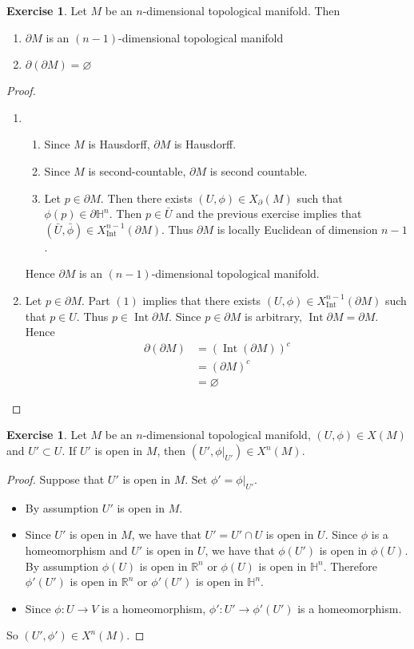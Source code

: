 \documentclass{book}
\theoremstyle{definition}
\newtheorem{ex}[definition]{Exercise}
\renewcommand{\H}{\mathbb{H}}
\newcommand{\R}{\mathbb{R}}
\DeclareMathOperator{\Int}{Int}
\DeclareMathOperator*{\0}{\mbf{0}}
\DeclareMathOperator*{\1}{\mbf{1}}
\newcommand{\p}{\partial}
\begin{document}
	\begin{ex}
		Let $M$ be an $n$-dimensional topological manifold. Then 
		\begin{enumerate}
			\item $\p M$ is an $(n-1)$-dimensional topological manifold
			\item $\p (\p M) = \varnothing$
		\end{enumerate}
	\end{ex}

	\begin{proof}\
		\begin{enumerate}
			\item 
			\begin{enumerate}
				\item Since $M$ is Hausdorff, $\p M$ is Hausdorff.
				\item Since $M$ is second-countable, $\p M$ is second countable. 
				\item Let $p \in \p M$. Then there exists $(U, \phi) \in X_{\p}(M)$ such that $\phi(p) \in \p \H^n$. Then $p \in \bar{U}$ and the previous exercise implies that $(\bar{U}, \bar{\phi}) \in X^{n-1}_{\Int}(\p M)$. Thus $\p M$ is locally Euclidean of dimension $n-1$.
			\end{enumerate}
			Hence $\p M$ is an $(n-1)$-dimensional topological manifold.
			\item Let $p \in \p M$. Part $(1)$ implies that there exists $(U, \phi) \in X^{n-1}_{\Int}(\p M)$ such that $p \in U$. Thus $p \in \Int \p M$. Since $p \in \p M$ is arbitrary, $\Int \p M = \p M$. Hence 
			\begin{align*}
				\p (\p M)
				& = (\Int(\p M))^c \\
				& = (\p M)^c \\
				& = \varnothing
			\end{align*} 
		\end{enumerate}
	\end{proof}

	\begin{ex}
		Let $M$ be an $n$-dimensional topological manifold, $(U, \phi) \in X(M)$ and $U' \subset U$. If $U'$ is open in $M$, then $(U', \phi|_{U'}) \in X^n(M)$. 
	\end{ex}
	
	\begin{proof}
		Suppose that $U'$ is open in $M$. Set $\phi' = \phi|_{U'}$. 
		\begin{itemize}
			\item By assumption $U'$ is open in $M$.
			\item Since $U'$ is open in $M$, we have that $U' = U' \cap U$ is open in $U$. Since $\phi$ is a homeomorphism and $U'$ is open in $U$, we have that $\phi(U')$ is open in $\phi(U)$. By assumption $\phi(U)$ is open in $\R^n$ or $\phi(U)$ is open in $\H^n$. Therefore $\phi'(U')$ is open in $\R^n$ or $\phi'(U')$ is open in $\H^n$.
			\item Since $\phi:U \rightarrow V$ is a homeomorphism, $\phi': U' \rightarrow \phi'(U')$ is a homeomorphism. 
		\end{itemize}
		So $(U', \phi') \in X^n(M)$. 
	\end{proof}
	
\end{document}
